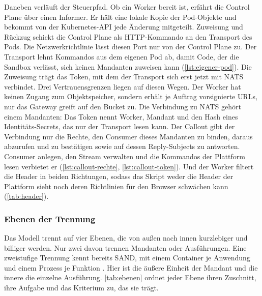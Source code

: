 Daneben verläuft der Steuerpfad. Ob ein Worker bereit ist, erfährt die Control Plane über einen Informer. Er hält
eine lokale Kopie der Pod-Objekte und bekommt von der Kubernetes-\ac{API} jede Änderung mitgeteilt. Zuweisung und Rückzug schickt die Control Plane als \ac{HTTP}-Kommando an den Transport des Pods. Die
Netzwerkrichtlinie lässt diesen Port nur von der Control Plane zu. Der Transport lehnt Kommandos aus dem eigenen
Pod ab, damit Code, der die Sandbox verlässt, sich keinen Mandanten zuweisen kann (\autoref{lst:eigener-pod}). Die
Zuweisung trägt das Token, mit dem der Transport sich erst jetzt mit NATS verbindet. Drei Vertrauensgrenzen liegen auf
diesen Wegen. Der Worker hat keinen Zugang zum Objektspeicher, sondern erhält je Auftrag vorsignierte \acp{URL}, nur
das Gateway greift auf den Bucket zu. Die Verbindung zu NATS gehört einem Mandanten: Das Token nennt Worker, Mandant
und den Hash eines Identitäts-Secrets, das nur der Transport lesen kann. Der Callout gibt der Verbindung nur
die Rechte, den Consumer dieses Mandanten zu binden, daraus abzurufen und zu bestätigen sowie auf dessen
Reply-Subjects zu antworten. Consumer anlegen, den Stream verwalten und die Kommandos der Plattform lesen verbietet er
(\autoref{lst:callout-rechte}, \autoref{lst:callout-token}). Und der Worker filtert die Header in beiden Richtungen, sodass das Skript weder die Header der Plattform sieht noch
deren Richtlinien für den Browser schwächen kann (\autoref{tab:header}).

\subsubsection{Ebenen der Trennung}
\label{sec:ebenen}

Das Modell trennt auf vier Ebenen, die von außen nach innen kurzlebiger und billiger werden. Nur
zwei davon trennen Mandanten oder Ausführungen. Eine zweistufige Trennung kennt bereits SAND, mit einem Container je
Anwendung und einem Prozess je Funktion \autocite[S.~924, 926]{akkus_sand_2018}. Hier ist die äußere Einheit der Mandant und
die innere die einzelne Ausführung. \autoref{tab:ebenen} ordnet jeder Ebene ihren Zuschnitt, ihre Aufgabe und das
Kriterium zu, das sie trägt.

